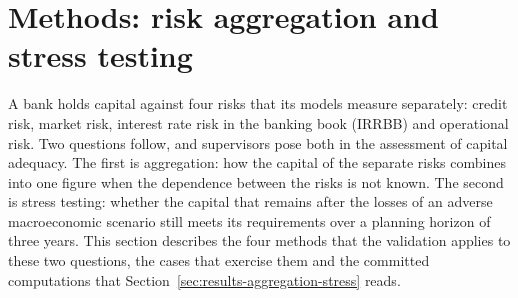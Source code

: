 \section{Methods: risk aggregation and stress testing}
\label{sec:aggregation-stress}


A bank holds capital against four risks that its models measure separately: credit risk, market risk, interest rate risk in the
banking book (IRRBB) and operational risk. Two questions follow, and supervisors pose both in the assessment of capital
adequacy. The first is aggregation: how the capital of the separate risks combines into one figure when the dependence between
the risks is not known. The second is stress testing: whether the capital that remains after the losses of an adverse
macroeconomic scenario still meets its requirements over a planning horizon of three years. This section describes the four
methods that the validation applies to these two questions, the cases that exercise them and the committed computations that
Section~\ref{sec:results-aggregation-stress} reads.


